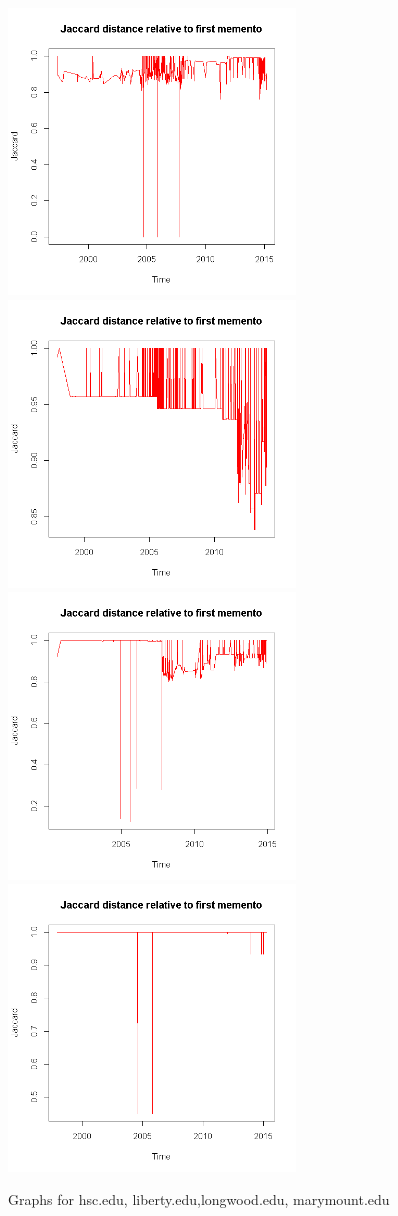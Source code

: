 \documentclass[12pt]{article} %
\begin{document}
\begin{figure}
\includegraphics[width=3in]{hsc-graph.png}
\includegraphics[width=3in]{liberty-graph.png}
\includegraphics[width=3in]{long-graph.png}
\includegraphics[width=3in]{mary-graph.png}
\caption{Graphs for hsc.edu, liberty.edu,longwood.edu, marymount.edu}
\end{figure}
\end{document}

